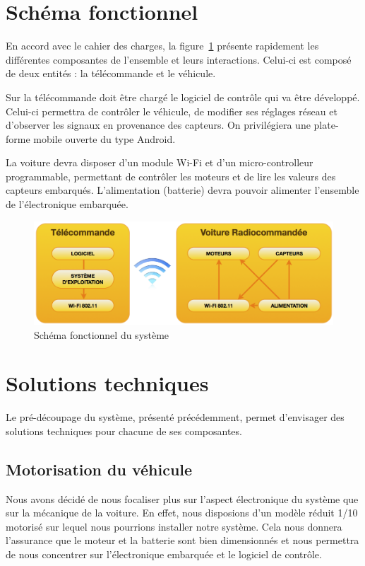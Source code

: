 \documentclass[a4paper,12pt]{report}
\begin{document}
	\section{Schéma fonctionnel}
	En accord avec le cahier des charges, la figure~\ref{schemafonctionnel} présente rapidement les différentes composantes de l’ensemble et leurs interactions. Celui-ci est composé de deux entités : la télécommande et le véhicule.

Sur la télécommande doit être chargé le logiciel de contrôle qui va être développé. Celui-ci permettra de contrôler le véhicule, de modifier ses réglages réseau et d’observer les signaux en provenance des capteurs. On privilégiera une plate-forme mobile ouverte du type Android.

La voiture devra disposer d’un module Wi-Fi et d’un micro-controlleur programmable, permettant de contrôler les moteurs et de lire les valeurs des capteurs embarqués. L’alimentation (batterie) devra pouvoir alimenter l’ensemble de l’électronique embarquée.

\begin{figure}%
	\begin{center}
		\includegraphics[scale=0.75]{images/schemafonctionnel.png}
	\end{center}
	\caption{Schéma fonctionnel du système} 
	\label{schemafonctionnel}
\end{figure}

	
	\section{Solutions techniques}
		Le pré-découpage du système, présenté précédemment, permet d’envisager des solutions techniques pour chacune de ses composantes.
		
		\subsection{Motorisation du véhicule}
		Nous avons décidé de nous focaliser plus sur l'aspect électronique du système que sur la mécanique de la voiture. En effet, nous disposions d'un modèle réduit 1/10\ieme{} motorisé sur lequel nous pourrions installer notre système. Cela nous donnera l'assurance que le moteur et la batterie sont bien dimensionnés et nous permettra de nous concentrer sur l'électronique embarquée et le logiciel de contrôle.
		
\end{document}
